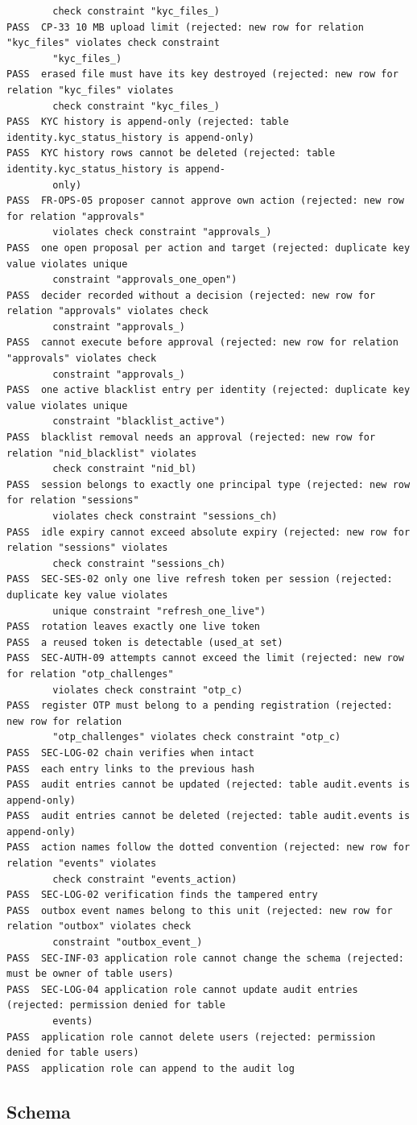 \documentclass[11pt,a4paper]{article}
\begin{document}
{\begin{verbatim}
        check constraint "kyc_files_)
PASS  CP-33 10 MB upload limit (rejected: new row for relation "kyc_files" violates check constraint
        "kyc_files_)
PASS  erased file must have its key destroyed (rejected: new row for relation "kyc_files" violates
        check constraint "kyc_files_)
PASS  KYC history is append-only (rejected: table identity.kyc_status_history is append-only)
PASS  KYC history rows cannot be deleted (rejected: table identity.kyc_status_history is append-
        only)
PASS  FR-OPS-05 proposer cannot approve own action (rejected: new row for relation "approvals"
        violates check constraint "approvals_)
PASS  one open proposal per action and target (rejected: duplicate key value violates unique
        constraint "approvals_one_open")
PASS  decider recorded without a decision (rejected: new row for relation "approvals" violates check
        constraint "approvals_)
PASS  cannot execute before approval (rejected: new row for relation "approvals" violates check
        constraint "approvals_)
PASS  one active blacklist entry per identity (rejected: duplicate key value violates unique
        constraint "blacklist_active")
PASS  blacklist removal needs an approval (rejected: new row for relation "nid_blacklist" violates
        check constraint "nid_bl)
PASS  session belongs to exactly one principal type (rejected: new row for relation "sessions"
        violates check constraint "sessions_ch)
PASS  idle expiry cannot exceed absolute expiry (rejected: new row for relation "sessions" violates
        check constraint "sessions_ch)
PASS  SEC-SES-02 only one live refresh token per session (rejected: duplicate key value violates
        unique constraint "refresh_one_live")
PASS  rotation leaves exactly one live token
PASS  a reused token is detectable (used_at set)
PASS  SEC-AUTH-09 attempts cannot exceed the limit (rejected: new row for relation "otp_challenges"
        violates check constraint "otp_c)
PASS  register OTP must belong to a pending registration (rejected: new row for relation
        "otp_challenges" violates check constraint "otp_c)
PASS  SEC-LOG-02 chain verifies when intact
PASS  each entry links to the previous hash
PASS  audit entries cannot be updated (rejected: table audit.events is append-only)
PASS  audit entries cannot be deleted (rejected: table audit.events is append-only)
PASS  action names follow the dotted convention (rejected: new row for relation "events" violates
        check constraint "events_action)
PASS  SEC-LOG-02 verification finds the tampered entry
PASS  outbox event names belong to this unit (rejected: new row for relation "outbox" violates check
        constraint "outbox_event_)
PASS  SEC-INF-03 application role cannot change the schema (rejected: must be owner of table users)
PASS  SEC-LOG-04 application role cannot update audit entries (rejected: permission denied for table
        events)
PASS  application role cannot delete users (rejected: permission denied for table users)
PASS  application role can append to the audit log
\end{verbatim}
}

\subsection{Schema}

\end{document}
